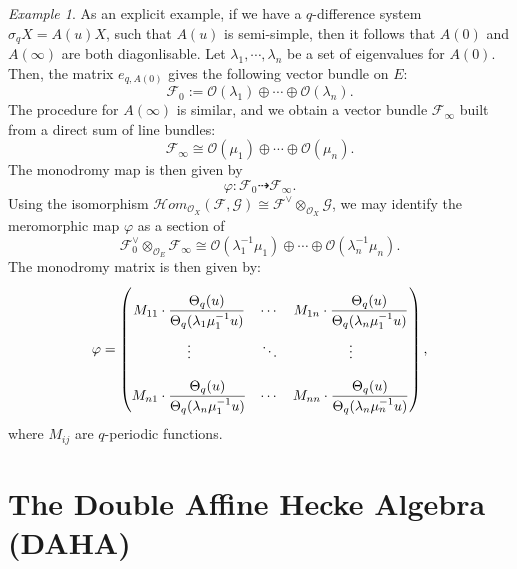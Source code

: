 \documentclass[a4paper]{report}
\theoremstyle{theorem}
\theoremstyle{definition}
\theoremstyle{remark}
\theoremstyle{proposition}
\theoremstyle{conjecture}
\theoremstyle{lemma}
\theoremstyle{corollary}
\theoremstyle{exercise}
\theoremstyle{example}
\newtheorem{example}{Example}
\newcommand{\mcal}{\mathcal}
\begin{document}
  \begin{example}
      As an explicit example, if we have a $q$-difference system $\sigma_q X = A(u) X$, such that 
      $A(u)$ is semi-simple, then it follows that $A(0)$ and $A(\infty)$ are both diagonlisable.
      Let $\lambda_1,\cdots,\lambda_n$ be a set of eigenvalues for $A(0)$. Then, the matrix $e_{q,A(0)}$ 
      gives the following vector bundle on $E$: 
      $$\mcal{F}_0 := \mcal{O}(\lambda_1) \oplus \cdots \oplus \mcal{O}(\lambda_n).$$ 
      The procedure for $A(\infty)$ is similar, and we obtain a vector bundle $\mcal{F}_\infty$ 
      built from a direct sum of line bundles: 
      $$\mcal{F}_\infty \cong \mcal{O}(\mu_1) \oplus \cdots \oplus \mcal{O}(\mu_n).$$
      The monodromy map is then given by 
      $$\varphi : \mcal{F}_0 \dashrightarrow \mcal{F}_\infty.$$
      Using the isomorphism $\mathscr{H}om_{\mcal{O}_X}(\mcal{F},\mcal{G}) \cong \mcal{F}^\vee \otimes_{\mcal{O}_X} \mcal{G}$,
      we may identify the meromorphic map $\varphi$ as a section of $$\mcal{F}_0^\vee \otimes_{\mcal{O}_E} \mcal{F}_\infty \cong \mcal{O}(\lambda_1^{-1}\mu_1) \oplus \cdots \oplus \mcal{O}(\lambda_n^{-1}\mu_n).$$
      The monodromy matrix is then given by: 
      $$\varphi = \renewcommand\arraystretch{2.5}\begin{pmatrix}
          M_{11} \cdot \displaystyle\frac{\Theta_q(u)}{\Theta_q(\lambda_1\mu_1^{-1}u)} & \cdots & M_{1n} \cdot \displaystyle\frac{\Theta_q(u)}{\Theta_q(\lambda_n\mu_1^{-1}u)}\\ 
          \vdots & \ddots & \vdots\\ 
          M_{n1} \cdot \displaystyle\frac{\Theta_q(u)}{\Theta_q(\lambda_n\mu_1^{-1}u)} & \cdots & M_{nn} \cdot \displaystyle\frac{\Theta_q(u)}{\Theta_q(\lambda_n\mu_n^{-1}u)}
      \end{pmatrix},$$
      where $M_{ij}$ are $q$-periodic functions.
  \end{example}
  
  \section{The Double Affine Hecke Algebra (DAHA)}
  
\end{document}
